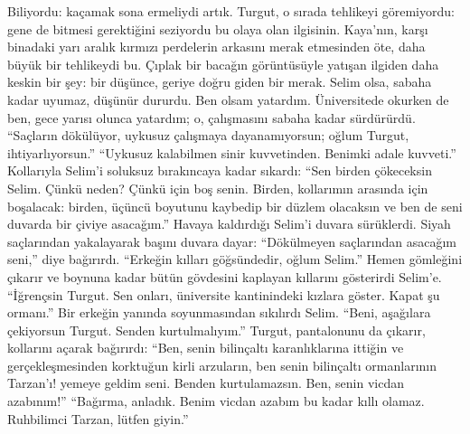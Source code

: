 \documentclass[a5paper,12pt]{scrbook}
\begin{document}
Biliyordu: kaçamak sona ermeliydi artık. Turgut, o sırada tehlikeyi göremiyordu:
gene de bitmesi gerektiğini seziyordu bu olaya olan ilgisinin. Kaya'nın, karşı
binadaki yarı aralık kırmızı perdelerin arkasını merak etmesinden öte, daha
büyük bir tehlikeydi bu. Çıplak bir bacağın görüntüsüyle yatışan ilgiden daha
keskin bir şey: bir düşünce, geriye doğru giden bir merak. Selim olsa, sabaha
kadar uyumaz, düşünür dururdu. Ben olsam yatardım. Üniversitede okurken de ben,
gece yarısı olunca yatardım; o, çalışmasını sabaha kadar sürdürürdü. ``Saçların
dökülüyor, uykusuz çalışmaya dayanamıyorsun; oğlum Turgut, ihtiyarlıyorsun.''
``Uykusuz kalabilmen sinir kuvvetinden. Benimki adale kuvveti.'' Kollarıyla
Selim'i soluksuz bırakıncaya kadar sıkardı: ``Sen birden çökeceksin Selim. Çünkü
neden? Çünkü için boş senin. Birden, kollarımın arasında için boşalacak: birden,
üçüncü boyutunu kaybedip bir düzlem olacaksın ve ben de seni duvarda bir çiviye
asacağım.'' Havaya kaldırdığı Selim'i duvara sürüklerdi. Siyah saçlarından
yakalayarak başını duvara dayar: ``Dökülmeyen saçlarından asacağım seni,'' diye
bağırırdı. ``Erkeğin kılları göğsündedir, oğlum Selim.'' Hemen gömleğini çıkarır
ve boynuna kadar bütün gövdesini kaplayan kıllarını gösterirdi Selim'e.
``İğrençsin Turgut. Sen onları, üniversite kantinindeki kızlara göster. Kapat şu
ormanı.'' Bir erkeğin yanında soyunmasından sıkılırdı Selim. ``Beni, aşağılara
çekiyorsun Turgut. Senden kurtulmalıyım.'' Turgut, pantalonunu da çıkarır,
kollarını açarak bağırırdı: ``Ben, senin bilinçaltı karanlıklarına ittiğin ve
gerçekleşmesinden korktuğun kirli arzuların, ben senin bilinçaltı ormanlarının
Tarzan'ı! yemeye geldim seni. Benden kurtulamazsın. Ben, senin vicdan azabınım!''
``Bağırma, anladık. Benim vicdan azabım bu kadar kıllı olamaz. Ruhbilimci Tarzan,
lütfen giyin.''
\end{document}
